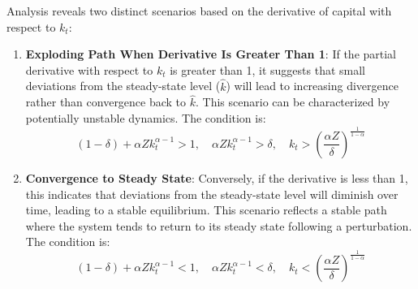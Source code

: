\documentclass[12pt]{report}
\begin{document}
Analysis reveals two distinct scenarios based on the derivative of capital with respect to \(k_{t}\):
\begin{enumerate}
    \item \textbf{Exploding Path When Derivative Is Greater Than 1}: If the partial derivative with respect to \(k_{t}\) is greater than 1, it suggests that small deviations from the
    steady-state level (\(\widehat{k}\)) will lead to increasing divergence rather than convergence back to
    \(\widehat{k}\). This scenario can be characterized by potentially unstable dynamics. The condition is:
    \[
    (1-\delta) + \alpha Z k_{t}^{\alpha-1} > 1, \quad \alpha Z k_{t}^{\alpha-1} > \delta, \quad k_{t} > \left(\frac{\alpha Z}{\delta}\right)^{\frac{1}{1-\alpha}}
    \]

    \item \textbf{Convergence to Steady State}: Conversely, if the derivative is less than 1, this indicates
    that deviations from the steady-state level will
    diminish over time, leading to a stable equilibrium. This scenario reflects a stable path where the system tends to
    return to its steady state following a perturbation.   The condition is:
    \[
    (1-\delta) + \alpha Z k_{t}^{\alpha-1} < 1, \quad \alpha Z k_{t}^{\alpha-1} < \delta, \quad k_{t} < \left(\frac{\alpha Z}{\delta}\right)^{\frac{1}{1-\alpha}}
    \]

\end{enumerate}
\end{document}
